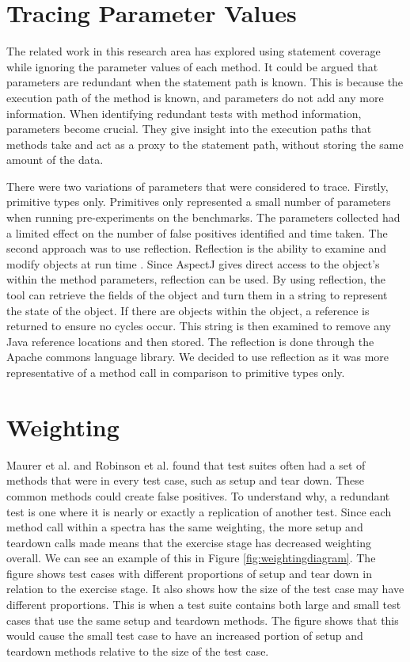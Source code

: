 \section{Tracing Parameter Values}
\label{parameterTrace}
The related work in this research area has explored using statement coverage while ignoring the parameter values of each method. It could be argued that parameters are redundant when the statement path is known. This is because the execution path of the method is known, and parameters do not add any more information. When identifying redundant tests with method information, parameters become crucial. They give insight into the execution paths that methods take and act as a proxy to the statement path, without storing the same amount of the data.

There were two variations of parameters that were considered to trace. Firstly, primitive types only. Primitives only represented a small number of parameters when running pre-experiments on the benchmarks.  The parameters collected had a limited effect on the number of false positives identified and time taken. The second approach was to use reflection. Reflection is the ability to examine and modify objects at run time \cite{oraclereflection}. Since AspectJ gives direct access to the object's within the method parameters, reflection can be used. By using reflection, the tool can retrieve the fields of the object and turn them in a string to represent the state of the object. If there are objects within the object, a reference is returned to ensure no cycles occur. This string is then examined to remove any Java reference locations and then stored. The reflection is done through the Apache commons language library. We decided to use reflection as it was more representative of a method call in comparison to primitive types only.

\section{Weighting }
Maurer et al. \cite{koochakzadeh2009test} and Robinson et al. \cite{li2008static} found that test suites often had a set of methods that were in every test case, such as setup and tear down. These common methods could create false positives. To understand why, a redundant test is one where it is nearly or exactly a replication of another test. Since each method call within a spectra has the same weighting, the more setup and teardown calls made means that the exercise stage has decreased weighting overall. We can see an example of this in Figure \ref{fig:weightingdiagram}. The figure shows test cases with different proportions of setup and tear down in relation to the exercise stage. It also shows how the size of the test case may have different proportions. This is when a test suite contains both large and small test cases that use the same setup and teardown methods. The figure shows that this would cause the small test case to have an increased portion of setup and teardown methods relative to the size of the test case.


